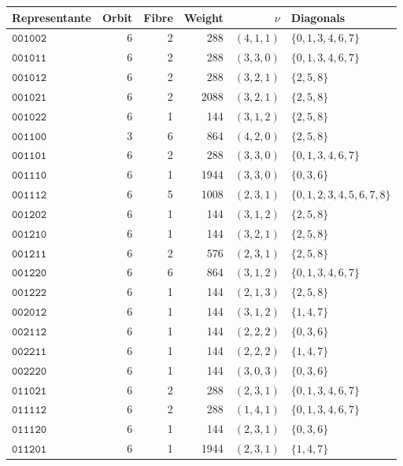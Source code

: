 \begin{longtable}{@{}lrrrrl@{}}
\toprule Representante&Orbit&Fibre&Weight&\(\nu\)&Diagonals\\\midrule\endhead
\(\mathtt{001002}\)&6&2&288&\((4,1,1)\)&\(\{0,1,3,4,6,7\}\)\\
\(\mathtt{001011}\)&6&2&288&\((3,3,0)\)&\(\{0,1,3,4,6,7\}\)\\
\(\mathtt{001012}\)&6&2&288&\((3,2,1)\)&\(\{2,5,8\}\)\\
\(\mathtt{001021}\)&6&2&2088&\((3,2,1)\)&\(\{2,5,8\}\)\\
\(\mathtt{001022}\)&6&1&144&\((3,1,2)\)&\(\{2,5,8\}\)\\
\(\mathtt{001100}\)&3&6&864&\((4,2,0)\)&\(\{2,5,8\}\)\\
\(\mathtt{001101}\)&6&2&288&\((3,3,0)\)&\(\{0,1,3,4,6,7\}\)\\
\(\mathtt{001110}\)&6&1&1944&\((3,3,0)\)&\(\{0,3,6\}\)\\
\(\mathtt{001112}\)&6&5&1008&\((2,3,1)\)&\(\{0,1,2,3,4,5,6,7,8\}\)\\
\(\mathtt{001202}\)&6&1&144&\((3,1,2)\)&\(\{2,5,8\}\)\\
\(\mathtt{001210}\)&6&1&144&\((3,2,1)\)&\(\{2,5,8\}\)\\
\(\mathtt{001211}\)&6&2&576&\((2,3,1)\)&\(\{2,5,8\}\)\\
\(\mathtt{001220}\)&6&6&864&\((3,1,2)\)&\(\{0,1,3,4,6,7\}\)\\
\(\mathtt{001222}\)&6&1&144&\((2,1,3)\)&\(\{2,5,8\}\)\\
\(\mathtt{002012}\)&6&1&144&\((3,1,2)\)&\(\{1,4,7\}\)\\
\(\mathtt{002112}\)&6&1&144&\((2,2,2)\)&\(\{0,3,6\}\)\\
\(\mathtt{002211}\)&6&1&144&\((2,2,2)\)&\(\{1,4,7\}\)\\
\(\mathtt{002220}\)&6&1&144&\((3,0,3)\)&\(\{0,3,6\}\)\\
\(\mathtt{011021}\)&6&2&288&\((2,3,1)\)&\(\{0,1,3,4,6,7\}\)\\
\(\mathtt{011112}\)&6&2&288&\((1,4,1)\)&\(\{0,1,3,4,6,7\}\)\\
\(\mathtt{011120}\)&6&1&144&\((2,3,1)\)&\(\{0,3,6\}\)\\
\(\mathtt{011201}\)&6&1&1944&\((2,3,1)\)&\(\{1,4,7\}\)\\

\end{longtable}
